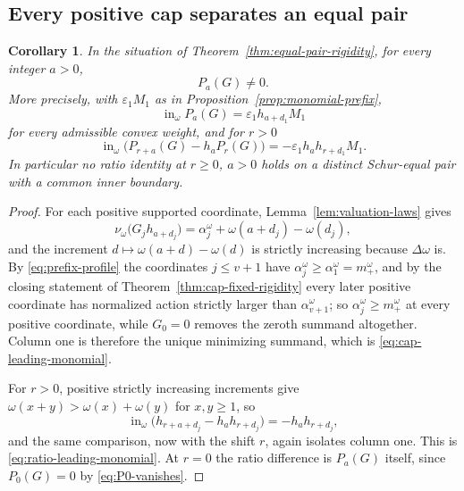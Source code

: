 \documentclass[11pt,a4paper]{amsart}
\numberwithin{equation}{section}
\theoremstyle{plain}
\newtheorem{corollary}[theorem]{Corollary}
\theoremstyle{definition}
\newcommand{\wto}{\nu_{\omega}}
\newcommand{\inin}{\operatorname{in}}
\begin{document}
\subsection{Every positive cap separates an equal pair}\label{subsec:cap-separation}

\begin{corollary}\label{cor:boundary-separation}
In the situation of Theorem~\ref{thm:equal-pair-rigidity}, for every integer \(a>0\),
\[
P_a(G)\ne0 .
\]
More precisely, with \(\varepsilon_1M_1\) as in Proposition~\ref{prop:monomial-prefix},
\begin{equation}\label{eq:cap-leading-monomial}
\inin_\omega P_a(G)=\varepsilon_1h_{a+d_1}M_1
\end{equation}
for every admissible convex weight, and for \(r>0\)
\begin{equation}\label{eq:ratio-leading-monomial}
\inin_\omega\bigl(P_{r+a}(G)-h_aP_r(G)\bigr)
=-\varepsilon_1h_ah_{r+d_1}M_1 .
\end{equation}
In particular no ratio identity at \(r\ge0\), \(a>0\) holds on a distinct
Schur-equal pair with a common inner boundary.
\end{corollary}

\begin{proof}
For each positive supported coordinate, Lemma~\ref{lem:valuation-laws} gives
\[
\wto\bigl(G_jh_{a+d_j}\bigr)
=
\alpha_j^\omega+\omega(a+d_j)-\omega(d_j),
\]
and the increment \(d\mapsto\omega(a+d)-\omega(d)\) is strictly increasing because \(\Delta\omega\) is.  By \eqref{eq:prefix-profile} the coordinates \(j\le v+1\) have \(\alpha_j^\omega\ge\alpha_1^\omega=m_+^\omega\), and by the closing statement of Theorem~\ref{thm:cap-fixed-rigidity} every later positive coordinate has normalized action strictly larger than \(\alpha_{v+1}^\omega\); so \(\alpha_j^\omega\ge m_+^\omega\) at every positive coordinate, while \(G_0=0\) removes the zeroth summand altogether.  Column one is therefore the unique minimizing summand, which is \eqref{eq:cap-leading-monomial}.

For \(r>0\), positive strictly increasing increments give \(\omega(x+y)>\omega(x)+\omega(y)\) for \(x,y\ge1\), so
\[
\inin_\omega\bigl(h_{r+a+d_j}-h_ah_{r+d_j}\bigr)=-h_ah_{r+d_j},
\]
and the same comparison, now with the shift \(r\), again isolates column one.  This is \eqref{eq:ratio-leading-monomial}.  At \(r=0\) the ratio difference is \(P_a(G)\) itself, since \(P_0(G)=0\) by \eqref{eq:P0-vanishes}.
\end{proof}
\end{document}
